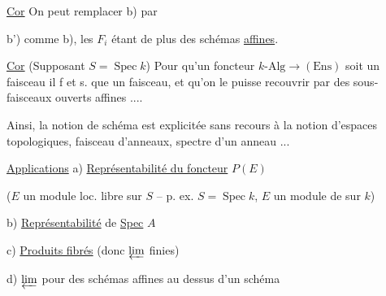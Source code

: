 \uline{Cor} On peut  remplacer b) par

b') comme b), les $F_i$ étant de plus des schémas \uline{affines}.

\uline{Cor} (Supposant $S=\operatorname{Spec} k$) Pour qu'un foncteur $k\text{-}\mathrm{Alg}\longrightarrow(\mathrm{Ens})$ soit un faisceau il f et s. que   un   faisceau, et qu'on le puisse recouvrir par des sous-faisceaux ouverts affines ....

Ainsi, la notion de schéma est explicitée sans recours à la notion d'espaces topologiques, faisceau d'anneaux, spectre d'un anneau ...

\uline{Applications} a) \uline{Représentabilité du foncteur} $P(E)$

($E$ un module loc. libre sur $S$ -- p. ex. $S=\operatorname{Spec} k$, $E$ un module de  sur $k$)

b) \uline{Représentabilité} de \uline{Spec} $A$

c) \uline{Produits fibrés} (donc $\varprojlim$ finies)


d) $\varprojlim$  pour des schémas affines au dessus d'un schéma

